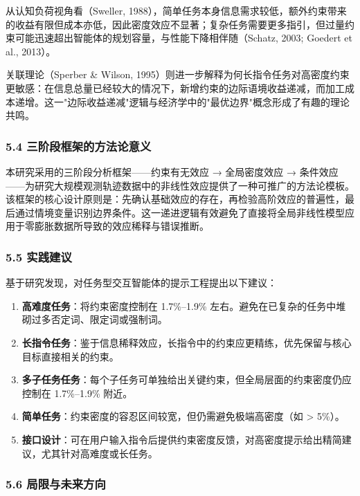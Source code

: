 \documentclass[12pt,a4paper,openany,oneside]{ctexrep}
\begin{document}
从认知负荷视角看（Sweller, 1988），简单任务本身信息需求较低，额外约束带来的收益有限但成本亦低，因此密度效应不显著；复杂任务需要更多指引，但过量约束可能迅速超出智能体的规划容量，与性能下降相伴随（Schatz, 2003; Goedert et al., 2013）。

关联理论（Sperber \& Wilson, 1995）则进一步解释为何长指令任务对高密度约束更敏感：在信息总量已经较大的情况下，新增约束的边际语境收益递减，而加工成本递增。这一"边际收益递减"逻辑与经济学中的"最优边界"概念形成了有趣的理论共鸣。

\subsubsection{5.4 三阶段框架的方法论意义}


本研究采用的三阶段分析框架——约束有无效应 → 全局密度效应 → 条件效应——为研究大规模观测轨迹数据中的非线性效应提供了一种可推广的方法论模板。该框架的核心设计原则是：先确认基础效应的存在，再检验高阶效应的普遍性，最后通过情境变量识别边界条件。这一递进逻辑有效避免了直接将全局非线性模型应用于零膨胀数据所导致的效应稀释与错误推断。

\subsubsection{5.5 实践建议}


基于研究发现，对任务型交互智能体的提示工程提出以下建议：

\begin{enumerate}
\item[1.] \textbf{高难度任务}：将约束密度控制在 1.7\%–1.9\% 左右。避免在已复杂的任务中堆砌过多否定词、限定词或强制词。
\item[2.] \textbf{长指令任务}：鉴于信息稀释效应，长指令中的约束应更精练，优先保留与核心目标直接相关的约束。
\item[3.] \textbf{多子任务任务}：每个子任务可单独给出关键约束，但全局层面的约束密度仍应控制在 1.7\%–1.9\% 附近。
\item[4.] \textbf{简单任务}：约束密度的容忍区间较宽，但仍需避免极端高密度（如 > 5\%）。
\item[5.] \textbf{接口设计}：可在用户输入指令后提供约束密度反馈，对高密度提示给出精简建议，尤其针对高难度或长任务。
\end{enumerate}


\subsubsection{5.6 局限与未来方向}
\end{document}
